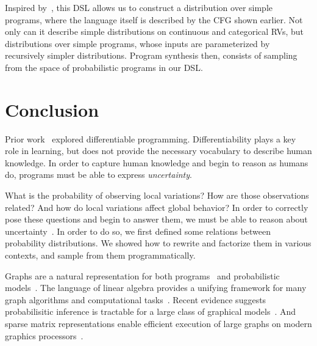 \documentclass{article}
\begin{document}

%
%
%

Inspired by~\citet{ellis2016sampling}, this DSL allows us to construct a distribution over simple programs, where the language itself is described by the CFG shown earlier. Not only can it describe simple distributions on continuous and categorical RVs, but distributions over simple programs, whose inputs are parameterized by recursively simpler distributions. Program synthesis then, consists of sampling from the space of probabilistic programs in our DSL.

\section{Conclusion}

Prior work~\citep{considine2019kotlingrad,considine2019programming} explored differentiable programming. Differentiability plays a key role in learning, but does not provide the necessary vocabulary to describe human knowledge. In order to capture human knowledge and begin to reason as humans do, programs must be able to express \textit{uncertainty}.

What is the probability of observing local variations? How are those observations related? And how do local variations affect global behavior? In order to correctly pose these questions and begin to answer them, we must be able to reason about uncertainty~\citep{pearl2014probabilistic}. In order to do so, we first defined some relations between probability distributions. We showed how to rewrite and factorize them in various contexts, and sample from them programmatically.

Graphs are a natural representation for both programs~\citep{allamanis2017learning} and probabilistic models~\citep{pearl2014probabilistic}. The language of linear algebra provides a unifying framework for many graph algorithms and computational tasks~\citep{kepner2011graph}. Recent evidence suggests probabilisitic inference is tractable for a large class of graphical models~\citep{choi2020probabilistic}. And sparse matrix representations enable efficient execution of large graphs on modern graphics processors~\citep{kepner2016mathematical}.
\end{document}
